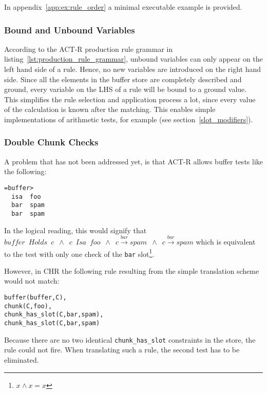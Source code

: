 In appendix~\ref{app:ex:rule_order} a minimal executable example is provided.

\subsubsection{Bound and Unbound Variables}
\label{bound_and_unbound_variables}

According to the ACT-R production rule grammar in listing~\ref{lst:production_rule_grammar}, unbound variables can only appear on the left hand side of a rule. Hence, no new variables are introduced on the right hand side. Since all the elements in the buffer store are completely described and ground, every variable on the LHS of a rule will be bound to a ground value. This simplifies the rule selection and application process a lot, since every value of the calculation is known after the matching. This enables simple implementations of arithmetic tests, for example (see section~\ref{slot_modifiers}).

\subsubsection{Double Chunk Checks}

A problem that has not been addressed yet, is that ACT-R allows buffer tests like the following:

\begin{lstlisting}
=buffer>
  isa  foo
  bar  spam
  bar  spam
\end{lstlisting}

In the logical reading, this would signify that $buffer \enspace Holds \enspace c \enspace \wedge \enspace c \enspace Isa \enspace foo \enspace \wedge \enspace c \xrightarrow{bar} spam \enspace \wedge \enspace c \xrightarrow{bar} spam$ which is equivalent to the test with only one check of the \verb|bar| slot\footnote{$x \wedge x = x$}.

However, in CHR the following rule resulting from the simple translation scheme would not match:

\begin{lstlisting}
buffer(buffer,C),
chunk(C,foo),
chunk_has_slot(C,bar,spam),
chunk_has_slot(C,bar,spam)
\end{lstlisting}

Because there are no two identical \verb|chunk_has_slot| constraints in the store, the rule could not fire. When translating such a rule, the second test has to be eliminated.

